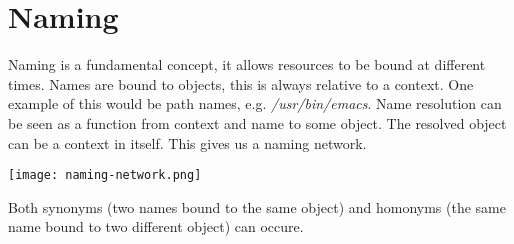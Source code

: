 \section{Naming}

Naming is a fundamental concept, it allows resources to be bound at different times. Names are bound to objects, this is always relative to a context. One example of this would be path names, e.g. \textit{/usr/bin/emacs}. Name resolution can be seen as a function from context and name to some object. The resolved object can be a context in itself. This gives us a naming network.
\begin{center}
	\texttt{[image: naming-network.png]}
\end{center}

Both synonyms (two names bound to the same object) and homonyms (the same name bound to two different object) can occure.